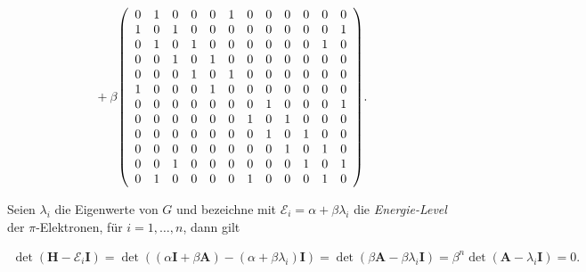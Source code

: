 {\begin{minipage}{\linewidth}
\begin{align*}
{                    }
                    +
                    \beta
                    {\left ( 
                        \begin{array}{cccccccccccc}
                            0 & 1 & 0 & 0 & 0 & 1 & 0 & 0 & 0 & 0 & 0 & 0 \\
                            1 & 0 & 1 & 0 & 0 & 0 & 0 & 0 & 0 & 0 & 0 & 1 \\
                            0 & 1 & 0 & 1 & 0 & 0 & 0 & 0 & 0 & 0 & 1 & 0 \\
                            0 & 0 & 1 & 0 & 1 & 0 & 0 & 0 & 0 & 0 & 0 & 0 \\
                            0 & 0 & 0 & 1 & 0 & 1 & 0 & 0 & 0 & 0 & 0 & 0 \\
                            1 & 0 & 0 & 0 & 1 & 0 & 0 & 0 & 0 & 0 & 0 & 0 \\
                            0 & 0 & 0 & 0 & 0 & 0 & 0 & 1 & 0 & 0 & 0 & 1 \\
                            0 & 0 & 0 & 0 & 0 & 0 & 1 & 0 & 1 & 0 & 0 & 0 \\
                            0 & 0 & 0 & 0 & 0 & 0 & 0 & 1 & 0 & 1 & 0 & 0 \\
                            0 & 0 & 0 & 0 & 0 & 0 & 0 & 0 & 1 & 0 & 1 & 0 \\
                            0 & 0 & 1 & 0 & 0 & 0 & 0 & 0 & 0 & 1 & 0 & 1 \\
                            0 & 1 & 0 & 0 & 0 & 0 & 1 & 0 & 0 & 0 & 1 & 0 \\
                        \end{array}
                     \right )}.
                \end{align*}            
            \end{minipage}
        }

        \phantom{}

        Seien $\lambda_i$ die Eigenwerte von $G$ und bezeichne mit $\mathcal E_i = \alpha + \beta \lambda_i$ die \textit{Energie-Level} der $\pi$-Elektronen, für $i = 1, \dots, n$, dann gilt

        \begin{align*}
            \det(\mathbf H - \mathcal E_i \mathbf I)
            =
            \det
            (
                (\alpha \mathbf I + \beta \mathbf A)
                -
                (\alpha + \beta \lambda_i) \mathbf I
            )
            =
            \det(\beta \mathbf A - \beta \lambda_i \mathbf I)
            =
            \beta^n \det(\mathbf A - \lambda_i \mathbf I)
            =
            0.    
        \end{align*}

